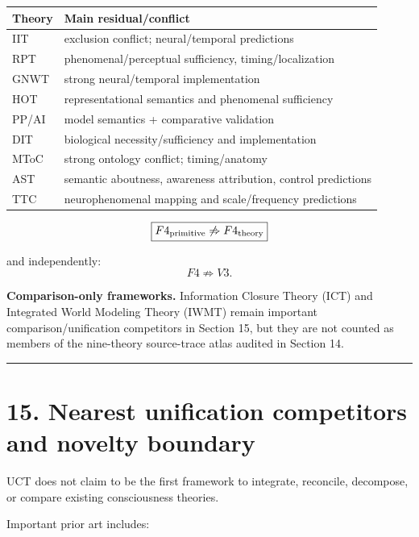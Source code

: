 \documentclass[
  11pt,
  a4paper,
]{article}
\begin{document}
\begin{longtable}[]{@{}ll@{}}
\toprule\noalign{}
Theory & Main residual/conflict \\
\midrule\noalign{}
\endhead
\bottomrule\noalign{}
\endlastfoot
IIT & exclusion conflict; neural/temporal predictions \\
RPT & phenomenal/perceptual sufficiency, timing/localization \\
GNWT & strong neural/temporal implementation \\
HOT & representational semantics and phenomenal sufficiency \\
PP/AI & model semantics + comparative validation \\
DIT & biological necessity/sufficiency and implementation \\
MToC & strong ontology conflict; timing/anatomy \\
AST & semantic aboutness, awareness attribution, control predictions \\
TTC & neurophenomenal mapping and scale/frequency predictions \\
\end{longtable}
\nopagebreak[4]
\[
\boxed{
F4_{\rm primitive}
\not\Rightarrow
F4_{\rm theory}
}
\]

and independently:
\nopagebreak[4]
\[
\boxed{
F4\not\Rightarrow V3.
}
\]

\textbf{Comparison-only frameworks.} Information Closure Theory (ICT)
and Integrated World Modeling Theory (IWMT) remain important
comparison/unification competitors in Section 15, but they are not
counted as members of the nine-theory source-trace atlas audited in
Section 14.

\begin{center}\rule{0.5\linewidth}{0.5pt}\end{center}

\hypertarget{nearest-unification-competitors-and-novelty-boundary}{%
\section{15. Nearest unification competitors and novelty
boundary}\label{nearest-unification-competitors-and-novelty-boundary}}

UCT does not claim to be the first framework to integrate, reconcile,
decompose, or compare existing consciousness theories.

Important prior art includes:
\end{document}

